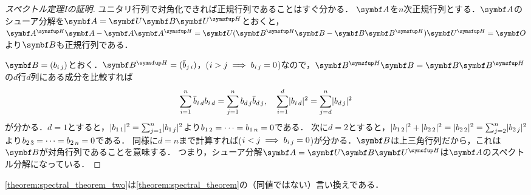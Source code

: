\documentclass[../../main]{subfiles}
\begin{document}
\begin{proof}[スペクトル定理Iの証明]
  ユニタリ行列で対角化できれば正規行列であることはすぐ分かる．
  \(\mat{A}\)を\(n\)次正規行列とする．\(\mat{A}\)のシューア分解を\(\mat{A}=\mat{U}\mat{B}\htrps{\mat{U}}\)とおくと，
  \(\htrps{\mat{A}}\mat{A}-\mat{A}\htrps{\mat{A}}=\mat{U}(\htrps{\mat{B}}\mat{B}-\mat{B}\htrps{\mat{B}})\htrps{\mat{U}}=\zmat\)より\(\mat{B}\)も正規行列である．

  \(\mat{B}=\matfence{\midx{b}{i}{j}}\)とおく．\(\htrps{\mat{B}}=\matfence{\midx{\conj{b}}{j}{i}}\)，(\(i>j\implies b_{i\,j}=0\))なので，\(\htrps{\mat{B}}\mat{B}=\mat{B}\htrps{\mat{B}}\)の\(d\)行\(d\)列にある成分を比較すれば
  \[
    \sum_{i=1}^n\midx{\conj{b}}{i}{d}\midx{b}{i}{d} = \sum_{j=1}^n\midx{b}{d}{j}\midx{\conj{b}}{d}{j},
    \quad\sum_{i=1}^d\abs{\midx{b}{i}{d}}^2 = \sum_{j=d}^n\abs{\midx{b}{d}{j}}^2
  \]
  が分かる．\(d=1\)とすると，\(\lvert b_{1\,1}\rvert^2=\sum_{j=1}^n\lvert b_{1\,j}\rvert^2\)より\(b_{1\,2}=\dots=b_{1\,n}=0\)である．
  次に\(d=2\)とすると，\(\lvert b_{1\,2}\rvert^2+\lvert b_{2\,2}\rvert^2=\lvert b_{2\,2}\rvert^2=\sum_{j=2}^n\lvert b_{2\,j}\rvert^2\)より\(b_{2\,3}=\dots=b_{2\,n}=0\)である．
  同様に\(d=n\)まで計算すれば(\(i<j\implies b_{i\,j}=0\))が分かる．\(\mat{B}\)は上三角行列だから，これは\(\mat{B}\)が対角行列であることを意味する．
  つまり，シューア分解\(\mat{A}=\mat{U}\mat{B}\htrps{\mat{U}}\)は\(\mat{A}\)のスペクトル分解になっている．
\end{proof}

\cref{theorem:spectral_theorem_two}は\cref{theorem:spectral_theorem}の（同値ではない）言い換えである．
\end{document}
